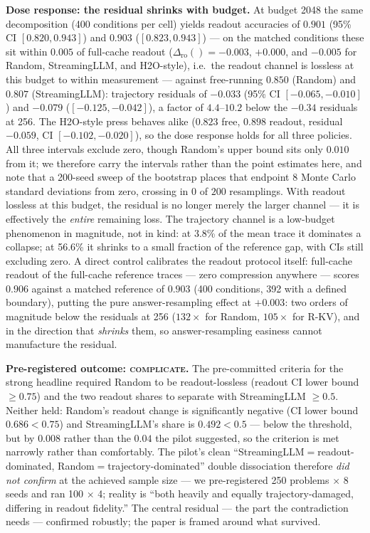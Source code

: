 \documentclass{article}
\newcommand{\dro}[1]{\Delta_{\mathrm{ro}}(#1)}
\begin{document}
\textbf{Dose response: the residual shrinks with budget.} At budget 2048 the same decomposition (400 conditions per cell) yields readout accuracies of $0.901$ (95\% CI $[0.820, 0.943]$) and $0.903$ ($[0.823, 0.943]$) --- on the matched conditions these sit within $0.005$ of full-cache readout ($\dro{} = -0.003$, $+0.000$, and $-0.005$ for Random, StreamingLLM, and H2O-style), i.e.\ the readout channel is lossless at this budget to within measurement --- against free-running $0.850$ (Random) and $0.807$ (StreamingLLM): trajectory residuals of $-0.033$ (95\% CI $[-0.065, -0.010]$) and $-0.079$ ($[-0.125, -0.042]$), a factor of $4.4$--$10.2$ below the $-0.34$ residuals at 256. The H2O-style press behaves alike ($0.823$ free, $0.898$ readout, residual $-0.059$, CI $[-0.102, -0.020]$), so the dose response holds for all three policies. All three intervals exclude zero, though Random's upper bound sits only $0.010$ from it; we therefore carry the intervals rather than the point estimates here, and note that a 200-seed sweep of the bootstrap places that endpoint $8$ Monte Carlo standard deviations from zero, crossing in $0$ of $200$ resamplings. With readout lossless at this budget, the residual is no longer merely the larger channel --- it is effectively the \emph{entire} remaining loss. The trajectory channel is a low-budget phenomenon in magnitude, not in kind: at 3.8\% of the mean trace it dominates a collapse; at 56.6\% it shrinks to a small fraction of the reference gap, with CIs still excluding zero. A direct control calibrates the readout protocol itself: full-cache readout of the full-cache reference traces --- zero compression anywhere --- scores $0.906$ against a matched reference of $0.903$ (400 conditions, 392 with a defined boundary), putting the pure answer-resampling effect at $+0.003$: two orders of magnitude below the residuals at 256 ($132\times$ for Random, $105\times$ for R-KV), and in the direction that \emph{shrinks} them, so answer-resampling easiness cannot manufacture the residual.

\textbf{Pre-registered outcome: \textsc{complicate}.} The pre-committed criteria for the strong headline required Random to be readout-lossless (readout CI lower bound $\ge 0.75$) and the two readout shares to separate with StreamingLLM $\ge 0.5$. Neither held: Random's readout change is significantly negative (CI lower bound $0.686 < 0.75$) and StreamingLLM's share is $0.492 < 0.5$ --- below the threshold, but by $0.008$ rather than the $0.04$ the pilot suggested, so the criterion is met narrowly rather than comfortably. The pilot's clean ``StreamingLLM$=$readout-dominated, Random$=$trajectory-dominated'' double dissociation therefore \emph{did not confirm} at the achieved sample size --- we pre-registered 250 problems $\times$ 8 seeds and ran 100 $\times$ 4; reality is ``both heavily and equally trajectory-damaged, differing in readout fidelity.'' The central residual --- the part the contradiction needs --- confirmed robustly; the paper is framed around what survived.
\end{document}
